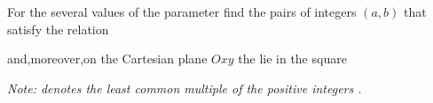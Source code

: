 For the several values of the parameter find the pairs of integers $(a,b)$ that satisfy the relation



and,moreover,on the Cartesian plane $Oxy$ the lie in the square 

\textit{Note: denotes the least common multiple of the positive integers .}